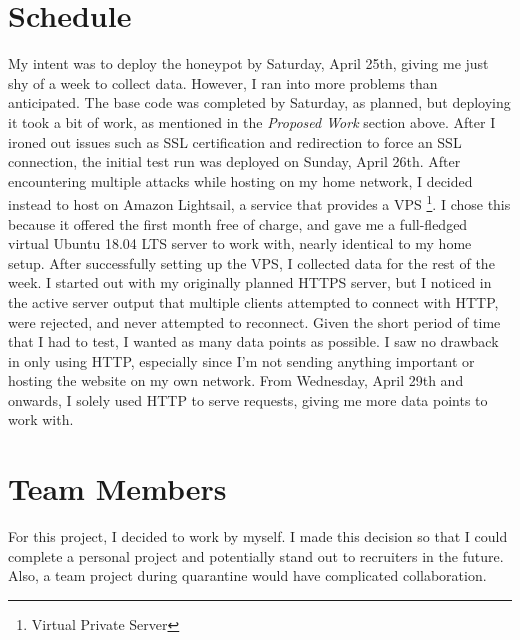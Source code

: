 \documentclass[12pt]{article}
\begin{document}
\section{Schedule}
My intent was to deploy the honeypot by Saturday, April 25th, giving me just shy of a week to collect data.
However, I ran into more problems than anticipated.
The base code was completed by Saturday, as planned, but deploying it took a bit of work, as mentioned in the \textit{Proposed Work} section above.
After I ironed out issues such as SSL certification and redirection to force an SSL connection, the initial test run was deployed on Sunday, April 26th.
After encountering multiple attacks while hosting on my home network, I decided instead to host on Amazon Lightsail, a service that provides a VPS \footnote{Virtual Private Server}.
I chose this because it offered the first month free of charge, and gave me a full-fledged virtual Ubuntu 18.04 LTS server to work with, nearly identical to my home setup.
After successfully setting up the VPS, I collected data for the rest of the week.
I started out with my originally planned HTTPS server, but I noticed in the active server output that multiple clients attempted to connect with HTTP, were rejected, and never attempted to reconnect.
Given the short period of time that I had to test, I wanted as many data points as possible.
I saw no drawback in only using HTTP, especially since I'm not sending anything important or hosting the website on my own network.
From Wednesday, April 29th and onwards, I solely used HTTP to serve requests, giving me more data points to work with.


\section{Team Members}
For this project, I decided to work by myself. I made this decision so that I could complete a personal project and potentially stand out to recruiters in the future. Also, a team project during quarantine would have complicated collaboration.

\clearpage
\printbibliography
\end{document}

